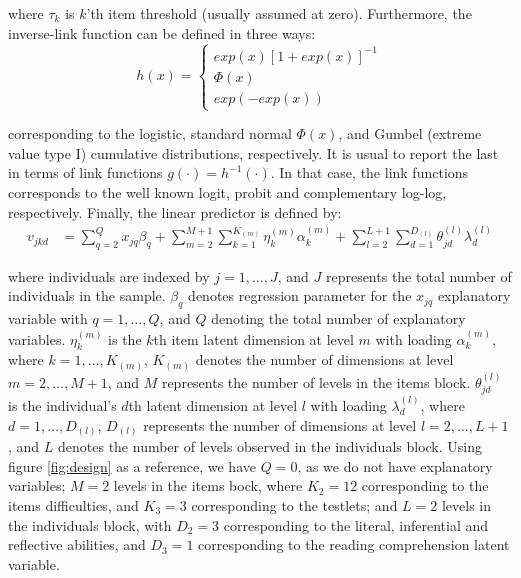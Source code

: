 \noindent where $\tau_{k}$ is $k$'th item threshold (usually assumed at zero). Furthermore, the inverse-link function can be defined in three ways:	
\begin{equation} \label{eq:response_dich1}
	h(x) = 
	\begin{cases}
		exp(x)[1 + exp(x)]^{-1} \\
		\Phi(x)  \\
		exp(-exp(x))
	\end{cases}
\end{equation}

\noindent corresponding to the logistic, standard normal $\Phi(x)$, and Gumbel (extreme value type I) cumulative distributions, respectively. It is usual to report the last in terms of link functions $g(\cdot) = h^{-1}(\cdot)$. In that case, the link functions corresponds to the well known logit, probit and complementary log-log, respectively. Finally, the linear predictor is defined by:
\begin{equation} \label{eq:linear_predictor1}
	\begin{split}
		v_{jkd} &= \sum_{q=2}^{Q} x_{jq} \beta_{q} + \sum_{m=2}^{M+1} \sum_{k=1}^{K_{(m)}} \eta_{k}^{(m)} \alpha_{k}^{(m)} + \sum_{l=2}^{L+1} \sum_{d=1}^{D_{(l)}} \theta_{jd}^{(l)} \lambda_{d}^{(l)}
	\end{split}
\end{equation}

\noindent where individuals are indexed by $j = 1, \dots, J$, and $J$ represents the total number of individuals in the sample. $\beta_{q}$ denotes regression parameter for the $x_{jq}$ explanatory variable with $q=1,\dots, Q$, and $Q$ denoting the total number of explanatory variables. $\eta_{k}^{(m)}$ is the $k$th item latent dimension at level $m$ with loading $\alpha_{k}^{(m)}$, where $k= 1, \dots, K_{(m)}$, $K_{(m)}$ denotes the number of dimensions at level $m=2,\dots, M+1$, and $M$ represents the number of levels in the items block. $\theta_{jd}^{(l)}$ is the individual's $d$th latent dimension at level $l$ with loading $\lambda_{d}^{(l)}$, where $d=1, \dots, D_{(l)}$, $D_{(l)}$ represents the number of dimensions at level $l=2, \dots, L+1$, and $L$ denotes the number of levels observed in the individuals block. Using figure \ref{fig:design} as a reference, we have $Q=0$, as we do not have explanatory variables; $M=2$ levels in the items bock, where $K_{2}=12$ corresponding to the items difficulties, and $K_{3}=3$ corresponding to the testlets; and $L=2$ levels in the individuals block, with $D_{2}=3$ corresponding to the literal, inferential and reflective abilities, and $D_{3}=1$ corresponding to the reading comprehension latent variable.

